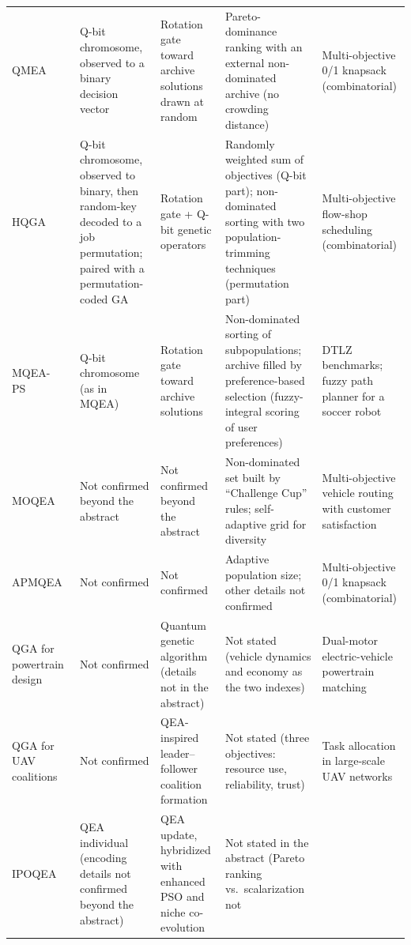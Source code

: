 \begin{xltabular}{\fulllength}{@{}p{2.1cm}XXXX@{}}
    QMEA~\citep{kim2006qmea} &
      Q-bit chromosome, observed to a binary decision vector &
      Rotation gate toward archive solutions drawn at
      random~\citep{kim2009mqea,ryu2014dmqea} &
      Pareto-dominance ranking with an external non-dominated archive (no
      crowding distance) &
      Multi-objective 0/1 knapsack (combinatorial) \\
    HQGA~\citep{li2007hqga} &
      Q-bit chromosome, observed to binary, then random-key decoded to a
      job permutation; paired with a permutation-coded GA &
      Rotation gate + Q-bit genetic operators &
      Randomly weighted sum of objectives (Q-bit part); non-dominated
      sorting with two population-trimming techniques (permutation part) &
      Multi-objective flow-shop scheduling (combinatorial) \\
    MQEA-PS~\citep{kim2011mqeaps} &
      Q-bit chromosome (as in MQEA) &
      Rotation gate toward archive solutions &
      Non-dominated sorting of subpopulations; archive filled by
      preference-based selection (fuzzy-integral scoring of user
      preferences) &
      DTLZ benchmarks; fuzzy path planner for a soccer robot \\
    MOQEA~\citep{zhang2012moqeavrp} &
      Not confirmed beyond the abstract &
      Not confirmed beyond the abstract &
      Non-dominated set built by ``Challenge Cup'' rules; self-adaptive
      grid for diversity &
      Multi-objective vehicle routing with customer satisfaction \\
    APMQEA~\citep{lu2013apmqea} &
      Not confirmed &
      Not confirmed &
      Adaptive population size; other details not confirmed &
      Multi-objective 0/1 knapsack (combinatorial) \\
    QGA for powertrain design~\citep{wang2014powertrain} &
      Not confirmed &
      Quantum genetic algorithm (details not in the abstract) &
      Not stated (vehicle dynamics and economy as the two indexes) &
      Dual-motor electric-vehicle powertrain matching \\
    QGA for UAV coalitions~\citep{mousavi2019uav} &
      Not confirmed &
      QEA-inspired leader--follower coalition formation &
      Not stated (three objectives: resource use, reliability, trust) &
      Task allocation in large-scale UAV networks \\
    IPOQEA~\citep{deng2020gate} &
      QEA individual (encoding details not confirmed beyond the
      abstract) &
      QEA update, hybridized with enhanced PSO and niche co-evolution &
      Not stated in the abstract (Pareto ranking vs.\ scalarization not

\end{xltabular}
